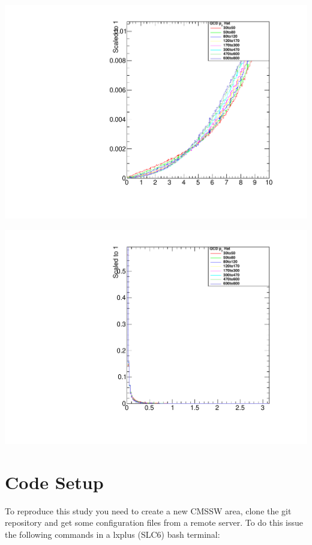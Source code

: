 \documentclass[a4paper]{article}
\begin{document}
\begin{minipage}{.5\textwidth}
  \centering
  \includegraphics[width=1.0\linewidth]{img/Dijet_MaxDEta.pdf}
\end{minipage}%
\begin{minipage}{0.5\textwidth}
  \centering
  \includegraphics[width=1.0\linewidth]{img/Dijet_MinDPhi.pdf}
\end{minipage}

\newpage
\appendix
\section{Code Setup}

To reproduce this study you need to create a new CMSSW area, clone the git repository and get some configuration files from a remote server. To do this issue the following commands in a lxplus (SLC6) bash terminal:
\end{document}
